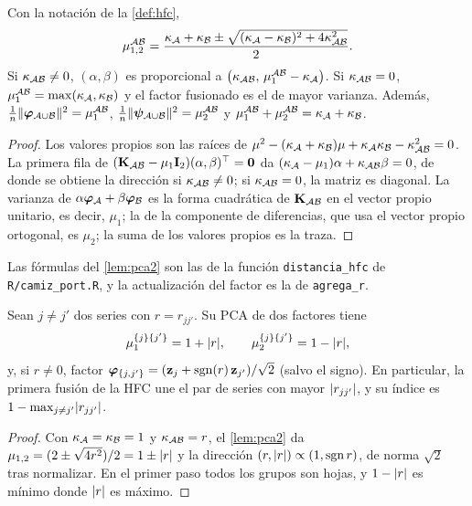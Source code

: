 \begin{lema}\label{lem:pca2}
Con la notación de la \cref{def:hfc},
\[
  \mu_{1,2}^{\mathcal{A}\mathcal{B}}=\frac{\kappa_{\mathcal{A}}+\kappa_{\mathcal{B}}\pm
  \sqrt{(\kappa_{\mathcal{A}}-\kappa_{\mathcal{B}})^2+4\kappa_{\mathcal{A}\mathcal{B}}^2}}{2}.
\]
Si $\kappa_{\mathcal{A}\mathcal{B}}\ne0$, $(\alpha,\beta)$ es proporcional a
$\bigl(\kappa_{\mathcal{A}\mathcal{B}},\,\mu_1^{\mathcal{A}\mathcal{B}}-\kappa_{\mathcal{A}}\bigr)$. Si $\kappa_{\mathcal{A}\mathcal{B}}=0$,
$\mu_1^{\mathcal{A}\mathcal{B}}=\max(\kappa_{\mathcal{A}},\kappa_{\mathcal{B}})$ y el factor fusionado es el de mayor varianza.
Además, $\frac1n\lVert \boldsymbol{\varphi}_{\mathcal{A}\cup\mathcal{B}}\rVert^2=\mu_1^{\mathcal{A}\mathcal{B}}$,
$\frac1n\lVert \boldsymbol{\psi}_{\mathcal{A}\cup\mathcal{B}}\rVert^2=\mu_2^{\mathcal{A}\mathcal{B}}$ y $\mu_1^{\mathcal{A}\mathcal{B}}+\mu_2^{\mathcal{A}\mathcal{B}}=\kappa_{\mathcal{A}}+
\kappa_{\mathcal{B}}$.
\end{lema}

\begin{proof}
Los valores propios son las raíces de
$\mu^2-(\kappa_{\mathcal{A}}+\kappa_{\mathcal{B}})\mu+\kappa_{\mathcal{A}}\kappa_{\mathcal{B}}-\kappa_{\mathcal{A}\mathcal{B}}^2=0$. La primera
fila de $(\mathbf{K}_{\mathcal{A}\mathcal{B}}-\mu_1\mathbf{I}_2)(\alpha,\beta)^{\top}=\mathbf{0}$ da $(\kappa_{\mathcal{A}}-\mu_1)\alpha+\kappa_{\mathcal{A}\mathcal{B}}\beta=0$, de donde se obtiene
la dirección si $\kappa_{\mathcal{A}\mathcal{B}}\ne0$; si $\kappa_{\mathcal{A}\mathcal{B}}=0$, la matriz es diagonal. La varianza de
$\alpha\boldsymbol{\varphi}_{\mathcal{A}}+\beta\boldsymbol{\varphi}_{\mathcal{B}}$ es la forma cuadrática de $\mathbf{K}_{\mathcal{A}\mathcal{B}}$ en el vector propio
unitario, es decir, $\mu_1$; la de la componente de diferencias, que usa el vector propio
ortogonal, es $\mu_2$; la suma de los valores propios es la traza.
\end{proof}

Las fórmulas del \cref{lem:pca2} son las de la función \texttt{distancia\_hfc} de
\texttt{R/camiz\_port.R}, y la actualización del factor es la de \texttt{agrega\_r}.

\begin{proposicion}\label{prop:hfc-hojas}
Sean $j\ne j'$ dos series con $r=r_{jj'}$. Su PCA de dos factores tiene
\[
  \mu_1^{\{j\}\{j'\}}=1+\lvert r\rvert,\qquad\mu_2^{\{j\}\{j'\}}=1-\lvert r\rvert,
\]
y, si $r\ne0$, factor $\boldsymbol{\varphi}_{\{j,j'\}}=(\mathbf{z}_j+\operatorname{sgn}(r)\,\mathbf{z}_{j'})/\sqrt2$ (salvo el
signo). En particular, la primera fusión de la HFC une el par de series con mayor
$\lvert r_{jj'}\rvert$, y su índice es $1-\max_{j\ne j'}\lvert r_{jj'}\rvert$.
\end{proposicion}

\begin{proof}
Con $\kappa_{\mathcal{A}}=\kappa_{\mathcal{B}}=1$ y $\kappa_{\mathcal{A}\mathcal{B}}=r$, el \cref{lem:pca2} da
$\mu_{1,2}=(2\pm\sqrt{4r^2})/2=1\pm\lvert r\rvert$ y la dirección $(r,\lvert r\rvert)\propto(1,\operatorname{sgn}
r)$, de norma $\sqrt2$ tras normalizar. En el primer paso todos los grupos son hojas, y
$1-\lvert r\rvert$ es mínimo donde $\lvert r\rvert$ es máximo.
\end{proof}

